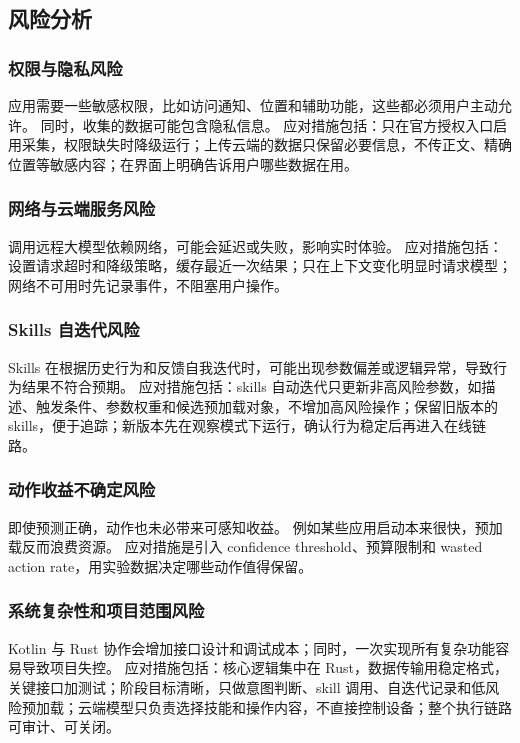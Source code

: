 \documentclass[12pt,a4paper]{article}
\begin{document}
\subsection{风险分析}\label{subsec:risk}

\subsubsection{权限与隐私风险}

应用需要一些敏感权限，比如访问通知、位置和辅助功能，这些都必须用户主动允许。
同时，收集的数据可能包含隐私信息。
应对措施包括：只在官方授权入口启用采集，权限缺失时降级运行；上传云端的数据只保留必要信息，不传正文、精确位置等敏感内容；在界面上明确告诉用户哪些数据在用。

\subsubsection{网络与云端服务风险}

调用远程大模型依赖网络，可能会延迟或失败，影响实时体验。
应对措施包括：设置请求超时和降级策略，缓存最近一次结果；只在上下文变化明显时请求模型；网络不可用时先记录事件，不阻塞用户操作。

\subsubsection{Skills 自迭代风险}

Skills 在根据历史行为和反馈自我迭代时，可能出现参数偏差或逻辑异常，导致行为结果不符合预期。
应对措施包括：skills 自动迭代只更新非高风险参数，如描述、触发条件、参数权重和候选预加载对象，不增加高风险操作；保留旧版本的 skills，便于追踪；新版本先在观察模式下运行，确认行为稳定后再进入在线链路。

\subsubsection{动作收益不确定风险}

即使预测正确，动作也未必带来可感知收益。
例如某些应用启动本来很快，预加载反而浪费资源。
应对措施是引入 confidence threshold、预算限制和 wasted action rate，用实验数据决定哪些动作值得保留。

\subsubsection{系统复杂性和项目范围风险}

Kotlin 与 Rust 协作会增加接口设计和调试成本；同时，一次实现所有复杂功能容易导致项目失控。
应对措施包括：核心逻辑集中在 Rust，数据传输用稳定格式，关键接口加测试；阶段目标清晰，只做意图判断、skill 调用、自迭代记录和低风险预加载；云端模型只负责选择技能和操作内容，不直接控制设备；整个执行链路可审计、可关闭。
\end{document}
